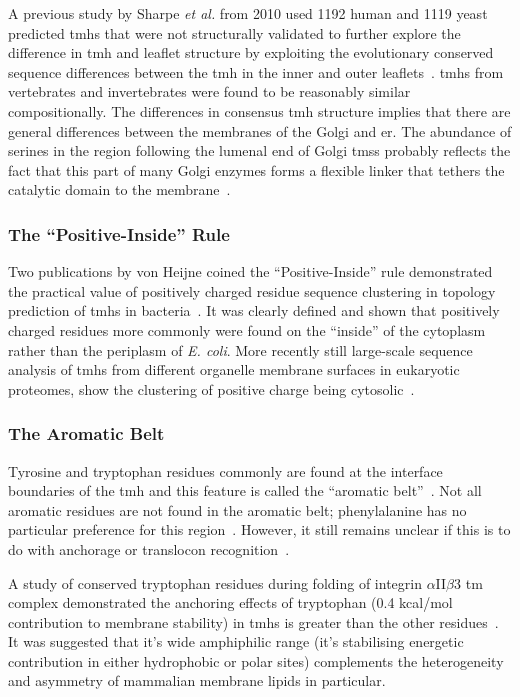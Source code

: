 A previous study by Sharpe \textit{et al.} from 2010 used 1192 human and 1119 yeast predicted \gls{tmh}s that were not structurally validated to further explore the difference in \gls{tmh} and leaflet structure by exploiting the evolutionary conserved sequence differences between the \gls{tmh} in the inner and outer leaflets~\cite{Sharpe2010}.
\gls{tmh}s from vertebrates and invertebrates were found to be reasonably similar compositionally.
The differences in consensus \gls{tmh} structure implies that there are general differences between the membranes of the Golgi and \gls{er}.
The abundance of serines in the region following the lumenal end of Golgi \gls{tms}s probably reflects the fact that this part of many Golgi enzymes forms a flexible linker that tethers the catalytic domain to the membrane~\cite{Sharpe2010}.

\subsubsection{The ``Positive-Inside'' Rule}

Two publications by von Heijne coined the ``Positive-Inside'' rule demonstrated the practical value of positively charged residue sequence clustering in topology prediction of \gls{tmh}s in bacteria~\cite{VonHeijne1989,Andersson1992}.
It was clearly defined and shown that positively charged residues more commonly were found on the ``inside'' of the cytoplasm rather than the periplasm of \textit{ E.
coli}.
More recently still large-scale sequence analysis of \gls{tmh}s from different organelle membrane surfaces in eukaryotic proteomes, show the clustering of positive charge being cytosolic~\cite{Sharpe2010, Baeza-Delgado2013, Pogozheva2013}.

\subsubsection{The Aromatic Belt}

 Tyrosine and tryptophan residues commonly are found at the interface boundaries of the \gls{tmh} and this feature is called the ``aromatic belt''~\cite{Hessa2005, Granseth2005, Sharpe2010, Baeza-Delgado2013, Nilsson2005a}.
Not all aromatic residues are not found in the aromatic belt; phenylalanine has no particular preference for this region~\cite{Granseth2005, Braun1999}.
However, it still remains unclear if this is to do with anchorage or translocon recognition~\cite{Baeza-Delgado2013}.

A study of conserved tryptophan residues during folding of integrin $\alpha$II$\beta$3 \gls{tm} complex demonstrated the anchoring effects of tryptophan (0.4 kcal/mol contribution to membrane stability) in \gls{tmh}s is greater than the other residues~\cite{Situ2018}. It was suggested that it's wide amphiphilic range (it's stabilising energetic contribution in either hydrophobic or polar sites) complements the heterogeneity and asymmetry of mammalian membrane lipids in particular.

